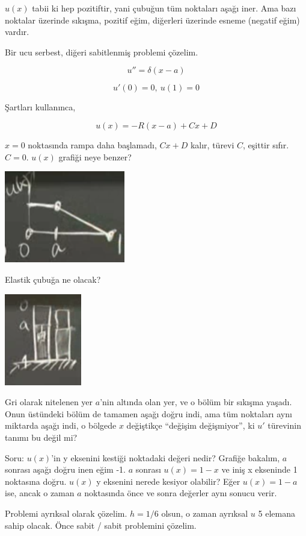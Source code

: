 \documentclass[12pt,fleqn]{article}\usepackage{../../common}
\begin{document}
$u(x)$ tabii ki hep pozitiftir, yani çubuğun tüm noktaları aşağı iner. Ama
bazı noktalar üzerinde sıkışma, pozitif eğim, diğerleri üzerinde esneme
(negatif eğim) vardır. 

Bir ucu serbest, diğeri sabitlenmiş problemi çözelim. 

$$ u'' = \delta(x-a) $$

$$ u'(0) = 0, \ u(1) = 0 $$

Şartları kullanınca, 

$$ u(x) = - R(x-a) + Cx + D $$

$x=0$ noktasında rampa daha başlamadı, $Cx + D$ kalır, türevi $C$, eşittir
sıfır. $C = 0$. $u(x)$ grafiği neye benzer?

\includegraphics[height=4cm]{4_11.png}

Elastik çubuğa ne olacak?

\includegraphics[height=4cm]{4_12.png}

Gri olarak nitelenen yer $a$'nin altında olan yer, ve o bölüm bir sıkışma
yaşadı. Onun üstündeki bölüm de tamamen aşağı doğru indi, ama tüm noktaları
aynı miktarda aşağı indi, o bölgede $x$ değiştikçe ``değişim değişmiyor'',
ki $u'$ türevinin tanımı bu değil mi? 

Soru: $u(x)$'in y eksenini kestiği noktadaki değeri nedir? Grafiğe bakalım,
$a$ sonrası aşağı doğru inen eğim -1. $a$ sonrası $u(x)=1-x$ ve iniş x
ekseninde 1 noktasına doğru. $u(x)$ y eksenini nerede kesiyor olabilir?
Eğer $u(x) = 1 -a$ ise, ancak o zaman $a$ noktasında önce ve sonra değerler
aynı sonucu verir. 

Problemi ayrıksal olarak çözelim. $h = 1/6$ olsun, o zaman ayrıksal $u$ 5
elemana sahip olacak. Önce sabit / sabit problemini çözelim. 
\end{document}
